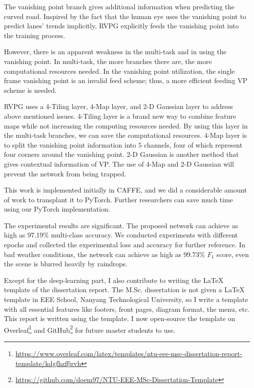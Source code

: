 \begin{spacing}{1.5}
The vanishing point branch gives additional information when predicting the curved road. Inspired by the fact that the human eye uses the vanishing point to predict lanes' trends implicitly, RVPG explicitly feeds the vanishing point into the training process.

However, there is an apparent weakness in the multi-task and in using the vanishing point. In multi-task, the more branches there are, the more computational resources needed. In the vanishing point utilization, the single frame vanishing point is an invalid feed scheme; thus, a more efficient feeding VP scheme is needed.

RVPG uses a 4-Tiling layer, 4-Map layer, and 2-D Gaussian layer to address above mentioned issues. 4-Tiling layer is a brand new way to combine feature maps while not increasing the computing resources needed. By using this layer in the multi-task branches, we can save the computational resources. 4-Map layer is to split the vanishing point information into $5$ channels, four of which represent four corners around the vanishing point. 2-D Gaussian is another method that gives contextual information of VP. The use of 4-Map and 2-D Gaussian will prevent the network from being trapped.

This work is implemented initially in CAFFE, and we did a considerable amount of work to transplant it to PyTorch. Further researchers can save much time using our PyTorch implementation.

The experimental results are significant. The proposed network can achieve as high as 97.19\% multi-class accuracy. We conducted experiments with different epochs and collected the experimental loss and accuracy for further reference. In bad weather conditions, the network can achieve as high as 99.73\% $F_1$ score, even the scene is blurred heavily by raindrops.

Except for the deep-learning part, I also contribute to writing the {\LaTeX} template of the dissertation report. The M.Sc. dissertation is not given a {\LaTeX} template in EEE School, Nanyang Technological University, so I write a template with all essential features like footers, front pages, diagram format, the menu, etc. This report is written using the template. I now open-source the template on Overleaf\footnote{\raggedright \url{https://www.overleaf.com/latex/templates/ntu-eee-msc-dissertation-report-template/kdgfhzffjrvh}} and GitHub\footnote{\url{https://github.com/doem97/NTU-EEE-MSc-Dissertation-Template}} for future master students to use.


\end{spacing}
